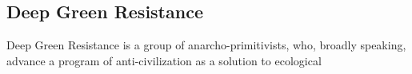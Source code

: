 \subsection{Deep Green Resistance}
\label{sec:-dgr}
Deep Green Resistance is a group of anarcho-primitivists, who, broadly 
speaking, advance a program of anti-civilization as a solution to 
ecological 


